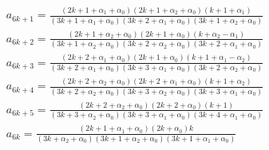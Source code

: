 \documentclass[12pt, a4paper]{report}
\begin{document}
$$
\begin{array}{lllllllllllllll}
a_{6k+1}=\displaystyle
\frac
{(2k+1+\alpha_1+\alpha_0)(2k+1+\alpha_2+\alpha_0)(k+1+\alpha_1)}
{(3k+1+\alpha_1+\alpha_0)(3k+2+\alpha_1+\alpha_0)(3k+1+\alpha_2+\alpha_0)}
\\
a_{6k+2}=\displaystyle\frac
{(2k+1+\alpha_2+\alpha_0)(2k+1+\alpha_0)(k+\alpha_2-\alpha_1)}
{(3k+1+\alpha_2+\alpha_0)(3k+2+\alpha_2+\alpha_0)(3k+2+\alpha_1+\alpha_0)}
\\
a_{6k+3}=\displaystyle\frac
{(2k+2+\alpha_1+\alpha_0)(2k+1+\alpha_0)(k+1+\alpha_1-\alpha_2)}
{(3k+2+\alpha_1+\alpha_0)(3k+3+\alpha_1+\alpha_0)(3k+2+\alpha_2+\alpha_0)}
\\
a_{6k+4}=\displaystyle\frac
{(2k+2+\alpha_2+\alpha_0)(2k+2+\alpha_1+\alpha_0)(k+1+\alpha_2)}
{(3k+2+\alpha_2+\alpha_0)(3k+3+\alpha_2+\alpha_0)(3k+3+\alpha_1+\alpha_0)}
\\
a_{6k+5}=\displaystyle\frac
{(2k+2+\alpha_2+\alpha_0)(2k+2+\alpha_0)(k+1)}
{(3k+3+\alpha_2+\alpha_0)(3k+3+\alpha_1+\alpha_0)(3k+4+\alpha_1+\alpha_0)}
\\
a_{6k}=\displaystyle\frac {(2k+1+\alpha_1+\alpha_0)(2k+\alpha_0)k}
{(3k+\alpha_2+\alpha_0)(3k+1+\alpha_2+\alpha_0)(3k+1+\alpha_1+\alpha_0)}
\end{array}
$$ 

\newpage
\end{document}
